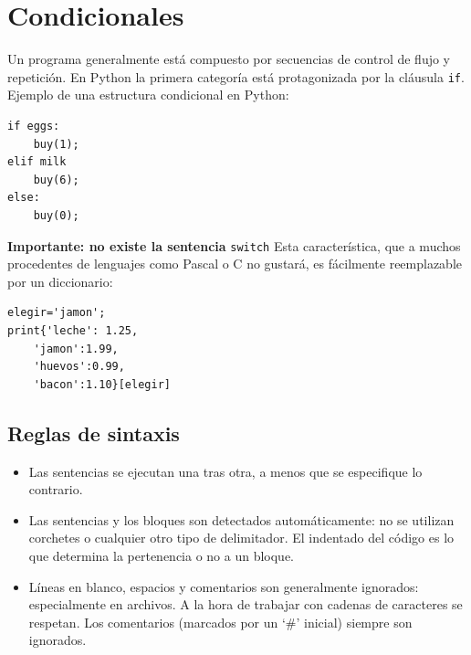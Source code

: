 \documentclass[12pt]{article} %
\begin{document}
\section{Condicionales}
Un programa generalmente está compuesto por secuencias de control de flujo y repetición. En Python la primera categoría está protagonizada por la cláusula \verb+if+.
Ejemplo de una estructura condicional en Python:
\begin{lstlisting}[frame=single, showspaces=false]
if eggs:
	buy(1);
elif milk
	buy(6);
else:
	buy(0);
\end{lstlisting}
{\Large \textbf{Importante: no existe la sentencia} \verb+switch+}
Esta característica, que a muchos procedentes de lenguajes como Pascal o C no gustará, es fácilmente reemplazable por un diccionario:
\begin{lstlisting}[frame=single, showspaces=false]
elegir='jamon';
print{'leche': 1.25,
	'jamon':1.99,
	'huevos':0.99,
	'bacon':1.10}[elegir]
\end{lstlisting}
\subsection{Reglas de sintaxis}
\begin{itemize}
	\item Las sentencias se ejecutan una tras otra, a menos que se especifique lo contrario.
	\item Las sentencias y los bloques son detectados automáticamente: no se utilizan corchetes o cualquier otro tipo de delimitador. El indentado del código es lo que determina la pertenencia o no a un bloque.
	\item Líneas en blanco, espacios y comentarios son generalmente ignorados: especialmente en archivos. A la hora de trabajar con cadenas de caracteres se respetan. Los comentarios (marcados por un `\#' inicial) siempre son ignorados.
\end{itemize}
\end{document}
